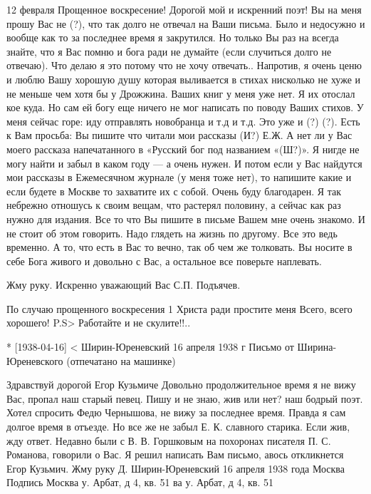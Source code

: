 \documentclass[]{memoir}
\begin{document}
12 февраля
Прощенное воскресение!
Дорогой мой и искренний поэт!
Вы на меня прошу Вас не (?),  что так долго не отвечал на Ваши письма. Было  и недосужно и вообще как то за последнее время я закрутился. Но только Вы раз на всегда знайте, что я Вас помню и бога ради не думайте (если случиться долго не отвечаю). Что делаю я это потому что не хочу отвечать.. Напротив, я очень ценю и люблю Вашу хорошую душу которая выливается в стихах нисколько не хуже и не меньше чем хотя бы у Дрожжина.
Ваших книг у меня уже нет. Я их отослал кое куда. Но сам ей богу еще ничего не мог написать по поводу Ваших стихов. У меня сейчас горе: иду отправлять новобранца и т.д и т.д. Это уже и (?) (?).
Есть к Вам просьба: Вы пишите что читали мои рассказы (И?) Е.Ж.  А нет ли у Вас моего рассказа напечатанного в «Русский бог под названием «(Ш?)». Я нигде не могу найти и забыл в каком году — а очень нужен. И потом если у Вас найдутся  мои рассказы в Ежемесячном журнале (у меня тоже нет), то напишите какие и если будете в Москве то захватите их с собой. Очень буду благодарен. Я так небрежно отношусь к своим вещам, что растерял половину, а сейчас как раз нужно для издания.
Все то что Вы пишите в письме Вашем мне очень знакомо. И не стоит об этом говорить. Надо глядеть на жизнь по другому. Все это ведь временно. А то, что есть в Вас то вечно, так об чем же толковать. Вы носите в себе Бога живого и довольно с Вас, а остальное все поверьте наплевать.

Жму руку.
Искренно уважающий Вас С.П. Подъячев.

По случаю прощенного воскресения 
1 Христа ради простите меня
Всего, всего хорошего!
P.S> Работайте и не скулите!!..

* [1938-04-16] < Ширин-Юреневский
16 апреля 1938 г 
Письмо  от Ширина-Юреневского (отпечатано на машинке)

Здравствуй дорогой Егор Кузьмиче
Довольно продолжительное время я не вижу Вас, пропал наш старый певец. Пишу и не знаю, жив или нет? наш бодрый поэт. Хотел спросить Федю Чернышова, не вижу за последнее время.  Правда я сам долгое время в отъезде. Но все же не забыл Е. К. славного старика.
Если жив, жду ответ. Недавно были с В. В. Горшковым на похоронах писателя П. С. Романова, говорили о Вас.
Я решил написать Вам письмо, авось откликнется Егор Кузьмич.
Жму руку Д. Ширин-Юреневский
16 апреля 1938 года
Москва
Подпись
Москва у. Арбат, д 4, кв. 51
ва у. Арбат, д 4, кв. 51
\end{document}
